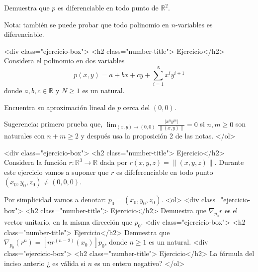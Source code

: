 \documentclass{article}
\theoremstyle{definition}
\begin{document}
              Demuestra que $p$ es diferenciable en todo punto de $\mathbb{R}^2$.

              
              Nota: también se puede probar que todo polinomio en $n$-variables es diferenciable.
              
            <div class="ejercicio-box"> <h2 class="number-title"> Ejercicio</h2> Considera el polinomio en dos variables
              $$p(x,y)= a + bx+ cy + \sum_{i=1}^N x^{i}y^{i+1}$$
              donde $a,b,c\in \mathbb{R}$ y $N\geq 1$ es un natural.
              
              Encuentra su aproximación lineal de $p$ cerca del $(0,0)$.

              Sugerencia: primero prueba que, $\lim_{(x,y)\to (0,0)} \frac{|x^ny^m|}{\|(x,y)\|}=0$ si
              $n,m\geq0$ son naturales con $n+m\geq 2$ y después usa la proposición 2 de las notas.
            </ol>

            
             <div class="ejercicio-box"> <h2 class="number-title"> Ejercicio</h2> Considera  la función  $r:\mathbb{R}^3 \to \mathbb{R}$ dada por $r(x,y,z)=\|(x,y,z)\|$. Durante
            este ejercicio vamos a suponer que $r$ es difeferenciable en todo punto $(x_0,y_0,z_0)\ne (0,0,0)$.

            Por simplicidad vamos a denotar: $p_0=(x_0,y_0,z_0)$.
            <ol>
            <div class="ejercicio-box"> <h2 class="number-title"> Ejercicio</h2> Demuestra que $\nabla_{p_0}r$ es el  vector unitario, en la misma dirección que
              $p_0$.
            <div class="ejercicio-box"> <h2 class="number-title"> Ejercicio</h2> Demuestra que $\nabla_{p_0}(r^n)=[nr^{(n-2)}(x_0)]p_0$, donde $n \geq 1$ es un natural.
            <div class="ejercicio-box"> <h2 class="number-title"> Ejercicio</h2> La fórmula del inciso anterio ¿ es válida si $n$ es un entero negativo?
            </ol>
         
\end{document}
